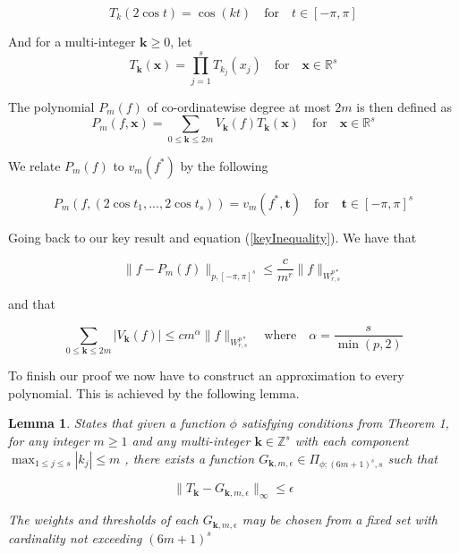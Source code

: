 \documentclass[11pt,a4paper]{article}
\theoremstyle{plain}
\newtheorem{lemma}[theorem]{Lemma}
\theoremstyle{definition}
\theoremstyle{remark}
\begin{document}
\begin{equation}
    T_{k}(2\cos t) = \cos(kt) \quad \text{for} \quad t \in [-\pi ,\pi ]
\end{equation}

And for a multi-integer \(\mathbf{k} \geq 0\), let 
\begin{equation}
    T_{\mathbf{k}}(\mathbf{x}) = \prod_{j=1}^{s} T_{k_{j}}(x_{j}) \quad \text{for} \quad \mathbf{x} \in \mathbb{R}^{s}
\end{equation}

The polynomial \(P_{m}(f)\) of co-ordinatewise degree at most \(2m\) is then defined as
\begin{equation}
    P_{m}(f, \mathbf{x}) = \sum_{0 \leq \mathbf{k} \leq 2m} V_{\mathbf{k}}(f) T_{\mathbf{k}}(\mathbf{x}) \quad \text{for} \quad \mathbf{x} \in \mathbb{R}^{s}  
\end{equation}

We relate \(P_{m}(f)\) to \(v_{m}(f^{\ast})\) by the following

\begin{equation}
    P_{m}(f, (2\cos t_1, ..., 2\cos t_s)) = v_{m}(f^{\ast}, \mathbf{t}) \quad \text{for} \quad \mathbf{t} \in [-\pi ,\pi ]^s
\end{equation}

Going back to our key result and equation (\ref{keyInequality}). We have that

\begin{equation}
    \|f - P_{m}(f)\|_{p,[-\pi,\pi]^s} \leq \frac{c}{m^r} \|f\|_{W^{p*}_{r,s}}
\end{equation}

and that 

\begin{equation}
    \sum_{0 \leq \mathbf{k} \leq 2m} |V_{\mathbf{k}}(f)| \leq cm^{\alpha} \|f\|_{W^{p*}_{r,s}}  \quad \text{where} \quad \alpha = \frac{s}{\min(p,2)}  
\end{equation}

To finish our proof we now have to construct an approximation to every polynomial. This is achieved by the following lemma.

\begin{lemma}
    States that given a function \(\phi\) satisfying conditions from Theorem 1, for any integer \(m \geq 1\) and any multi-integer \(\mathbf{k} \in \mathbb{Z}^{s} \) with each component \(\mathop{\max}_{1 \leq j \leq s} |k_{j}| \leq m\) , there exists a function \(G_{\mathbf{k} ,m ,\epsilon} \in \Pi_{\phi ; (6m +1)^s, s}\) such that 

    \begin{equation}
        \|T_{\mathbf{k}} - G_{\mathbf{k} ,m ,\epsilon}\|_{\infty} \leq \epsilon
    \end{equation}
    
    The weights and thresholds of each \(G_{\mathbf{k} ,m,\epsilon }\) may be chosen from a fixed set with cardinality not exceeding \((6m  +1)^s\) 
\end{lemma}
\end{document}
